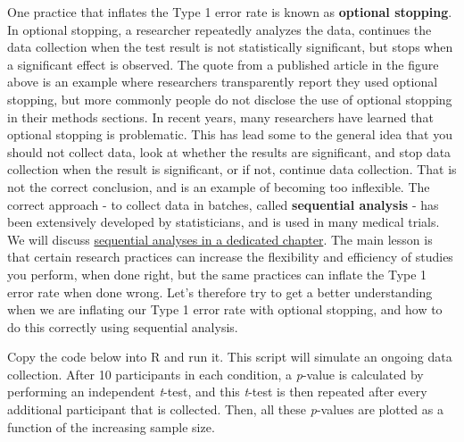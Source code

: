 \documentclass[
  oneside]{krantz}
\begin{document}
One practice that inflates the Type 1 error rate is known as \textbf{optional stopping}. In optional stopping, a researcher repeatedly analyzes the data, continues the data collection when the test result is not statistically significant, but stops when a significant effect is observed. The quote from a published article in the figure above is an example where researchers transparently report they used optional stopping, but more commonly people do not disclose the use of optional stopping in their methods sections. In recent years, many researchers have learned that optional stopping is problematic. This has lead some to the general idea that you should not collect data, look at whether the results are significant, and stop data collection when the result is significant, or if not, continue data collection. That is not the correct conclusion, and is an example of becoming too inflexible. The correct approach - to collect data in batches, called \textbf{sequential analysis} - has been extensively developed by statisticians, and is used in many medical trials. We will discuss \protect\hyperlink{sequential}{sequential analyses in a dedicated chapter}. The main lesson is that certain research practices can increase the flexibility and efficiency of studies you perform, when done right, but the same practices can inflate the Type 1 error rate when done wrong. Let's therefore try to get a better understanding when we are inflating our Type 1 error rate with optional stopping, and how to do this correctly using sequential analysis.

Copy the code below into R and run it. This script will simulate an ongoing data collection. After 10 participants in each condition, a \emph{p}-value is calculated by performing an independent \emph{t}-test, and this \emph{t}-test is then repeated after every additional participant that is collected. Then, all these \emph{p}-values are plotted as a function of the increasing sample size.
\end{document}
